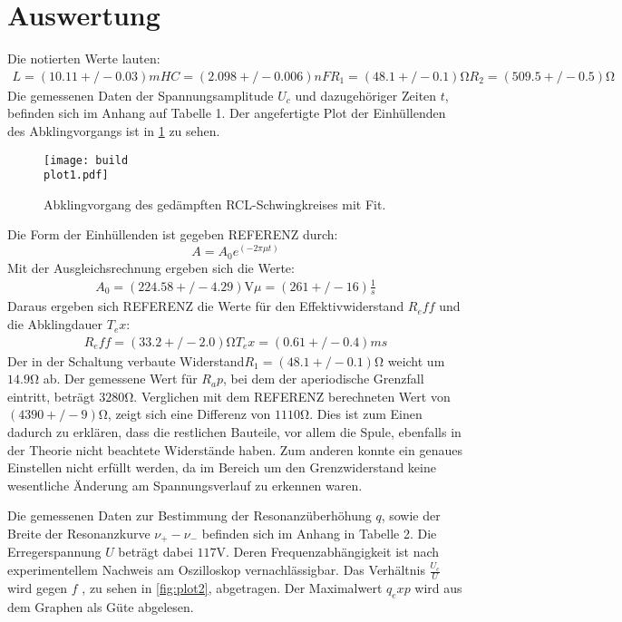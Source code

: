 \section{Auswertung}
\label{sec:Auswertung}
Die notierten Werte lauten:
\begin{align}
L = (10.11 +/- 0.03) mH 
C = (2.098 +/- 0.006) nF
R_1 = (48.1 +/- 0.1) \si{\ohm}
R_2 = (509.5 +/- 0.5) \si{\ohm}
\end{align}
Die gemessenen Daten der Spannungsamplitude $U_c$ und dazugehöriger Zeiten $t$,
befinden sich im Anhang auf Tabelle 1.
Der angefertigte Plot der Einhüllenden des Abklingvorgangs ist in \ref{fig:plot1} zu sehen.
\begin{figure}
  \centering
  \texttt{[image: build\\plot1.pdf]}
  \caption{Abklingvorgang des gedämpften RCL-Schwingkreises mit Fit.}
  \label{fig:plot1}
\end{figure}

Die Form der Einhüllenden ist gegeben REFERENZ durch:
\begin{equation}
  A = A_0 e^(-2 \pi \mu t)
\end{equation}
Mit der Ausgleichsrechnung ergeben sich die Werte:
\begin{align}
  A_0 = (224.58 +/- 4.29) \si{\volt}
  \mu = (261 +/- 16) \frac{1}{s}
\end{align}
Daraus ergeben sich REFERENZ die Werte für den Effektivwiderstand $R_eff$ und die Abklingdauer $T_ex$:
\begin{align}
  R_eff = (33.2 +/- 2.0) \si{\ohm}
  T_ex = (0.61 +/- 0.4) ms
\end{align}
Der in der Schaltung verbaute Widerstand$R_1 = (48.1 +/- 0.1) \si{\ohm}$ weicht um $14.9 \si{\ohm}$ ab.
Der gemessene Wert für $R_ap$, bei dem der aperiodische Grenzfall eintritt, beträgt $3280 \si{\ohm}$.
Verglichen mit dem REFERENZ berechneten Wert von $(4390 +/- 9) \si{\ohm}$, zeigt sich eine Differenz von $1110 \si{\ohm}$.
Dies ist zum Einen dadurch zu erklären, dass die restlichen Bauteile, vor allem die Spule, ebenfalls in der Theorie nicht beachtete Widerstände haben.
Zum anderen konnte ein genaues Einstellen nicht erfüllt werden, da im Bereich um den Grenzwiderstand keine wesentliche Änderung am Spannungsverlauf zu erkennen waren.

Die gemessenen Daten zur Bestimmung der Resonanzüberhöhung $q$, sowie der Breite der Resonanzkurve $\nu_+ - \nu_-$ befinden sich im Anhang in Tabelle 2.
Die Erregerspannung $U$ beträgt dabei $117 \si{\volt}$.
Deren Frequenzabhängigkeit ist nach experimentellem Nachweis am Oszilloskop vernachlässigbar.
Das Verhältnis $\frac{U_c}{U}$ wird gegen $f$ , zu sehen in \ref{fig:plot2}, abgetragen.
Der Maximalwert $q_exp$ wird aus dem Graphen als Güte abgelesen.

